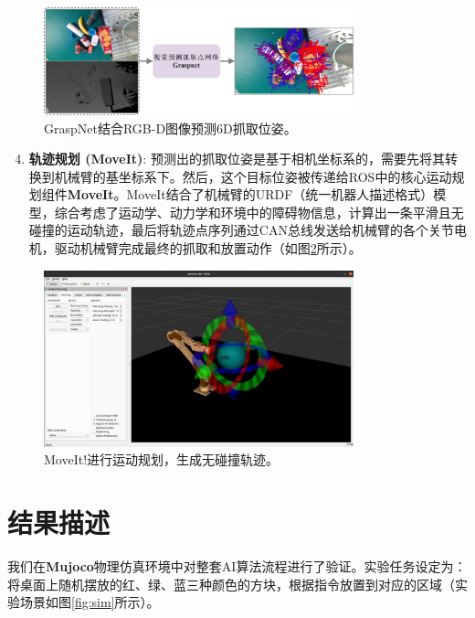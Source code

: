 \documentclass{article}
\begin{document}
\begin{CJK*}{UTF8}{gbsn}
\begin{figure}[h!]
    \centering
    \includegraphics[width=0.8\textwidth]{image/report/fig_graspnet_pose.png}
    \caption{GraspNet结合RGB-D图像预测6D抓取位姿。}
    \label{fig:graspnet}
\end{figure}

\begin{enumerate}
    \setcounter{enumi}{3}
    \item  \textbf{轨迹规划 (MoveIt)}: 预测出的抓取位姿是基于相机坐标系的，需要先将其转换到机械臂的基坐标系下。然后，这个目标位姿被传递给ROS中的核心运动规划组件\textbf{MoveIt}。MoveIt结合了机械臂的URDF（统一机器人描述格式）模型，综合考虑了运动学、动力学和环境中的障碍物信息，计算出一条平滑且无碰撞的运动轨迹，最后将轨迹点序列通过CAN总线发送给机械臂的各个关节电机，驱动机械臂完成最终的抓取和放置动作（如图\ref{fig:moveit}所示）。
\end{enumerate}

\begin{figure}[h!]
    \centering
    \includegraphics[width=0.8\textwidth]{image/report/fig_moveit_planning.png}
    \caption{MoveIt!进行运动规划，生成无碰撞轨迹。}
    \label{fig:moveit}
\end{figure}

\section{结果描述}

我们在\textbf{Mujoco}物理仿真环境中对整套AI算法流程进行了验证。实验任务设定为：将桌面上随机摆放的红、绿、蓝三种颜色的方块，根据指令放置到对应的区域（实验场景如图\ref{fig:sim}所示）。


\end{CJK*}
\end{document}
